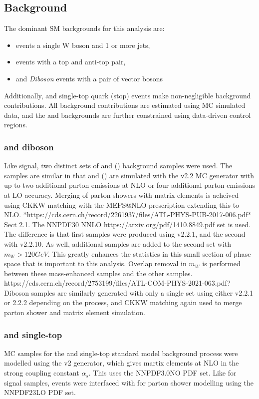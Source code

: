 \subsection{Background}
\label{subsection:mc_bkg}
The dominant SM backgrounds for this analysis are:
\begin{itemize}
    \item \wjets events a single W boson and 1 or more jets,
    \item \ttbar events with a top and anti-top pair,
    \item and \textit{Diboson} events with a pair of vector bosons
\end{itemize}
Additionally, \zjets and single-top quark (stop) events make non-negligible background contributions. All background contributions are estimated using MC simulated data, and the \wjets and \ttbar backgrounds are further constrained using data-driven control regions.

\subsubsection{\vjets and diboson}
Like signal, two distinct sets of \wjets and \zjets (\vjets) background samples were used. The samples are similar in that \wjets and \zjets (\vjets) are simulated with the \sherpa v2.2 MC generator with up to two additional parton emissions at NLO or four additional parton emissions at LO accuracy. Merging of parton showers with matrix elements is acheived using CKKW matching with the MEPS@NLO prescription extending this to NLO. *https://cds.cern.ch/record/2261937/files/ATL-PHYS-PUB-2017-006.pdf* Sect 2.1. The NNPDF30 NNLO https://arxiv.org/pdf/1410.8849.pdf set is used.
The difference is that first samples were produced using \sherpa v2.2.1, and the second with \sherpa v2.2.10. As well, additional \wjets samples are added to the second set with $m_W > 120 GeV$. This greatly enhances the statistics in this small section of phase space that is important to this analysis. Overlap removal in $m_W$ is performed between these mass-enhanced samples and the other \wjets samples. https://cds.cern.ch/record/2753199/files/ATL-COM-PHYS-2021-063.pdf?
Diboson samples are similarly generated with only a single set using either \sherpa v2.2.1 or 2.2.2 depending on the process, and CKKW matching again used to merge parton shower and matrix element simulation.

\subsubsection{\ttbar and single-top}
MC samples for the \ttbar and single-top standard model background process were modelled using the \powhegbox v2 generator, which gives martix elements at NLO in the strong coupling constant $\alpha_s$. This uses the NNPDF3.0NO PDF set. Like for signal samples, events were interfaced with  for parton shower modelling using the NNPDF23LO PDF set.

